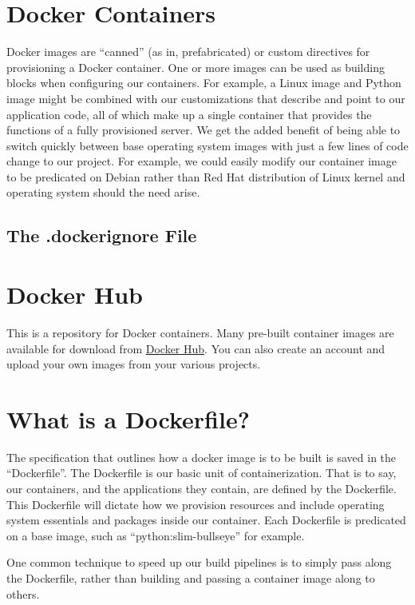 \section{Docker Containers}

\justifying
Docker images are ``canned'' (as in, prefabricated) or custom directives for provisioning a Docker container. One or more
images can be used as building blocks when configuring our containers. For example, a Linux image and Python image might
be combined with our customizations that describe and point to our application code, all of which make up a single container
that provides the functions of a fully provisioned server. We get the added
benefit of being able to switch quickly between base operating system images with just a few lines of code change to our
project. For example, we could easily modify our container image to be predicated on Debian
rather than Red Hat distribution of Linux kernel and operating system should the need arise.

\subsection{The .dockerignore File}

\section{Docker Hub}

\justifying
This is a repository for Docker containers. Many pre-built container images are available for download
from \href{https://hub.docker.com/}{Docker Hub}. You can also create an account and upload your own images from your various
projects.

\section{What is a Dockerfile?}

\justifying
The specification that outlines how a docker image is to be built is saved in the ``Dockerfile''.
The Dockerfile is our basic unit of containerization. That is to say, our containers, and the applications they contain, are defined by the
Dockerfile. This Dockerfile will dictate how we provision resources and include operating system essentials and packages inside our container. Each Dockerfile is predicated on a base image, such as ``python:slim-bullseye'' for example.

\justifying
One common technique to speed up our build pipelines is to simply pass along the Dockerfile, rather than
building and passing a container image along to others.

